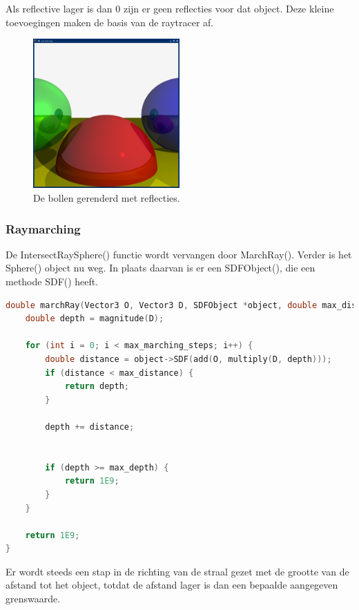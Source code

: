 \documentclass[12pt, a4paper]{article}
\begin{document}
Als reflective lager is dan 0 zijn er geen reflecties voor dat object. Deze kleine toevoegingen maken de basis van de raytracer af.

\begin{figure}[H]
    \centering
    \includegraphics[width=0.50\textwidth]{renders/reflection.png}
    \caption{De bollen gerenderd met reflecties.}
    \label{fig:reflection}
\end{figure}

\subsubsection{Raymarching}\label{raymarching}

De IntersectRaySphere() functie wordt vervangen door MarchRay(). Verder is het Sphere() object nu weg. In plaats daarvan is er een SDFObject(), die een methode SDF() heeft.

\begin{lstlisting}[language=C++]
double marchRay(Vector3 O, Vector3 D, SDFObject *object, double max_distance, int max_marching_steps, double max_depth) {
    double depth = magnitude(D);

    for (int i = 0; i < max_marching_steps; i++) {
        double distance = object->SDF(add(O, multiply(D, depth)));
        if (distance < max_distance) {
            return depth;
        }

        depth += distance;


        if (depth >= max_depth) {
            return 1E9;
        }
    }

    return 1E9;
}
\end{lstlisting}

Er wordt steeds een stap in de richting van de straal gezet met de grootte van de afstand tot het object, totdat de afstand lager is dan een bepaalde aangegeven grenswaarde.
\end{document}
